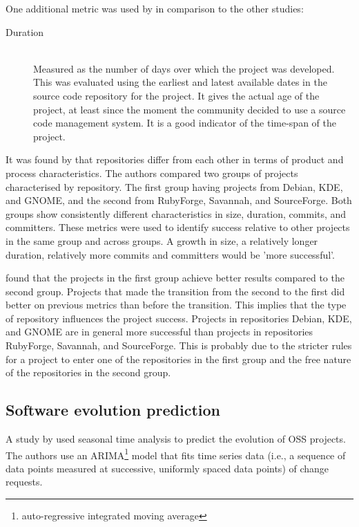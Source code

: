 One additional metric was used by \citeauthor{beecher} in comparison to the
other studies:
\begin{description}
	\item[Duration] \hfill \\ Measured as the number of days over which the
		project was developed. This was evaluated using the earliest and latest
		available dates in the source code repository for the project. It gives the
		actual age of the project, at least since the moment the community decided to
		use a source code management system. It is a good indicator of the time-span
		of the project.
\end{description}

\noindent
It was found by \citeauthor{beecher} that repositories differ from each other in
terms of product and process characteristics. The authors compared two groups of
projects characterised by repository. The first group having projects from
Debian, KDE, and GNOME, and the second from RubyForge, Savannah, and
SourceForge. Both groups show consistently different characteristics in size,
duration, commits, and committers. These metrics were used to identify success
relative to other projects in the same group and across groups. A growth in
size, a relatively longer duration, relatively more commits and committers
would be 'more successful'.

\citeauthor{beecher} found that the projects in the first group achieve better
results compared to the second group. Projects that made the transition from
the second to the first did better on previous metrics than before the
transition. This implies that the type of repository influences the project
success. Projects in repositories Debian, KDE, and GNOME are in general more
successful than projects in repositories RubyForge, Savannah, and SourceForge.
This is probably due to the stricter rules for a project to enter one of the
repositories in the first group and the free nature of the repositories in the
second group.



\subsection{Software evolution prediction}
A study by \citet{goulao} used seasonal time analysis to predict the evolution
of OSS projects. The authors use an ARIMA\footnote{auto-regressive integrated
moving average} model that fits time series data (i.e., a sequence of data
points measured at successive, uniformly spaced data points) of change
requests.

